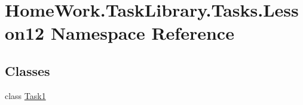 \hypertarget{namespace_home_work_1_1_task_library_1_1_tasks_1_1_lesson12}{}\section{Home\+Work.\+Task\+Library.\+Tasks.\+Lesson12 Namespace Reference}
\label{namespace_home_work_1_1_task_library_1_1_tasks_1_1_lesson12}
\subsection*{Classes}
\begin{DoxyCompactItemize}
\item 
class \mbox{\hyperlink{class_home_work_1_1_task_library_1_1_tasks_1_1_lesson12_1_1_task1}{Task1}}
\end{DoxyCompactItemize}
